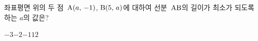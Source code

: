 좌표평면 위의 두 점~$\mathrm{A}(a,\,-1)$, $\mathrm{B}(5,\,a)$에 대하여 선분~$\mathrm{AB}$의 길이가 최소가 되도록 하는 $a$의 값은?
\begin{choices32}{$-3$}{$-2$}{$-1$}{$1$}{$2$}\end{choices32}

